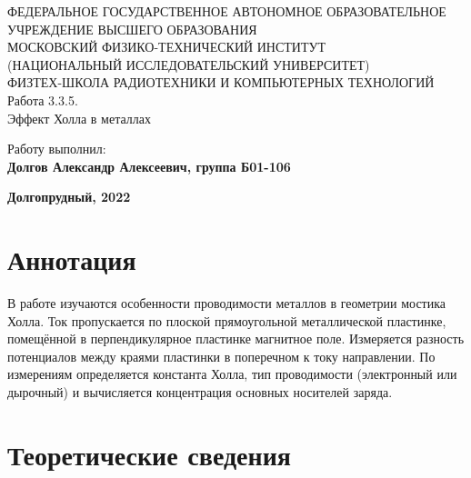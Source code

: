 \documentclass[15pt,a5paper,reqno]{article}
\begin{document}
\begin{center}
  {\small ФЕДЕРАЛЬНОЕ ГОСУДАРСТВЕННОЕ АВТОНОМНОЕ ОБРАЗОВАТЕЛЬНОЕ\\ УЧРЕЖДЕНИЕ ВЫСШЕГО ОБРАЗОВАНИЯ\\ МОСКОВСКИЙ ФИЗИКО-ТЕХНИЧЕСКИЙ ИНСТИТУТ\\ (НАЦИОНАЛЬНЫЙ ИССЛЕДОВАТЕЛЬСКИЙ УНИВЕРСИТЕТ)\\ ФИЗТЕХ-ШКОЛА РАДИОТЕХНИКИ И КОМПЬЮТЕРНЫХ ТЕХНОЛОГИЙ}\\
  \hfill \break
  \hfill \break
  \hfill \break
  \Huge{Работа 3.3.5. \\ Эффект Холла в металлах}\\
\end{center}

\hfill \break
\hfill \break
\hfill \break
\hfill \break
\hfill \break
\hfill \break
\hfill \break
\hfill \break
\hfill \break
\hfill \break
\hfill \break
\hfill \break
\hfill \break

\begin{flushright}
  \normalsize{Работу выполнил:}\\
  \normalsize{\textbf{Долгов Александр Алексеевич, группа Б01-106}}\\
\end{flushright}

\begin{center}
  \normalsize{\textbf{Долгопрудный, 2022}}
\end{center}

\thispagestyle{empty} %


\newpage
\thispagestyle{plain}
\tableofcontents
\thispagestyle{plain}
\newpage

\section{Аннотация}

    В работе изучаются особенности проводимости металлов в геометрии мостика Холла. Ток пропускается по плоской прямоугольной металлической пластинке, помещённой в перпендикулярное пластинке магнитное поле. Измеряется разность потенциалов между краями пластинки в поперечном к току направлении. По измерениям определяется константа Холла, тип проводимости (электронный или дырочный) и вычисляется концентрация основных носителей заряда.
    
\section{Теоретические сведения}
\end{document}
